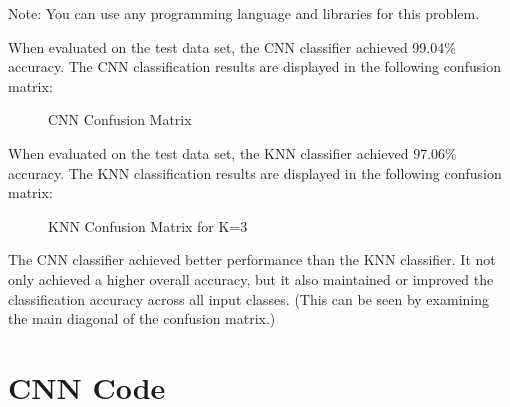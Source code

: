 \documentclass[fleqn]{article}
\begin{document}
\begin{enumerate}
		Note: You can use any programming language and libraries for this \newline problem.
		
		\pagebreak
		
		When evaluated on the test data set, the CNN classifier achieved 99.04\% accuracy. The CNN classification results are displayed in the following confusion matrix:
		
		\begin{figure}[H]
			\centerline{}
			\caption{CNN Confusion Matrix}
			\label{cnn_confusion_matrix}
		\end{figure}
		
		When evaluated on the test data set, the KNN classifier achieved 97.06\% accuracy. The KNN classification results are displayed in the following confusion matrix:
		
		\begin{figure}[H]
			\centerline{}
			\caption{KNN Confusion Matrix for K=3}
			\label{knn_confusion_matrix}
		\end{figure}		
	
		The CNN classifier achieved better performance than the KNN classifier. It not only achieved a higher overall accuracy, but it also maintained or improved the classification accuracy across all input classes. (This can be seen by examining the main diagonal of the confusion matrix.)
	
	\end{enumerate}
	
	\pagebreak
	\appendix
	\section{CNN Code}
	\label{cnn_code}
	\lstset{style=Matlab-editor,basicstyle=\ttfamily\footnotesize}
	
	
	
	\raggedbottom
\end{document}
